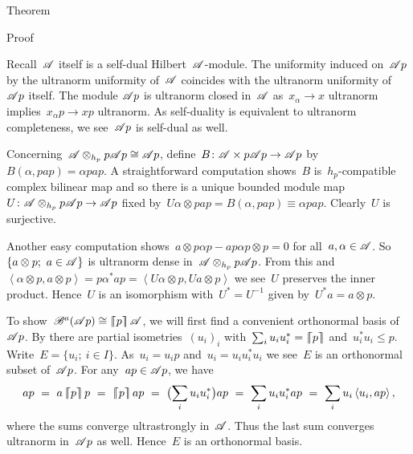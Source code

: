 \documentclass[b]{subfiles}
\begin{document}
\begin{parsec}
\begin{point}{Theorem}
\begin{point}{Proof}
\begin{point}
Recall~$\mathscr{A}$ itself is a self-dual Hilbert~$\mathscr{A}$-module.
The uniformity induced on~$\mathscr{A} p$ by the ultranorm uniformity
    of~$\mathscr{A}$ coincides with the ultranorm uniformity of~$\mathscr{A} p$ itself.
The module $\mathscr{A} p$ is ultranorm closed in~$\mathscr{A}$
    as~$x_\alpha \to x$ ultranorm
    implies~$x_\alpha p \to xp$ ultranorm.
As self-duality is equivalent to ultranorm completeness,
    we see~$\mathscr{A} p$ is self-dual as well.
\end{point}
\begin{point}%
Concerning~$\mathscr{A} \otimes_{h_p} p \mathscr{A} p \cong \mathscr{A} p$,
    define~$B\colon \mathscr{A} \times  p \mathscr{A} p \to \mathscr{A} p$
    by~$B(\alpha, pap) = \alpha pap$.
A straightforward computation
    shows~$B$ is~$h_p$-compatible complex bilinear map
    and so there is a unique bounded module
    map~$U \colon \mathscr{A} \otimes_{h_p} p \mathscr{A} p \to \mathscr{A} p$
   fixed by~$U \alpha \otimes pap = B(\alpha,pap) \equiv \alpha pap $.
   Clearly~$U$ is surjective.

Another easy computation shows~$a \otimes p\alpha p - ap\alpha p \otimes p = 0$
    for all~$a, \alpha \in \mathscr{A}$.
So~$\{a \otimes p;\ a\in \mathscr{A}\}$
    is ultranorm dense in~$\mathscr{A} \otimes_{h_p} p \mathscr{A} p$.
From this and
    $\left<\alpha \otimes p, a\otimes p\right> = 
        p \alpha^* a p
        =\left< U \alpha \otimes p, U a \otimes p\right> $
        we see~$U$ preserves the inner product.
Hence~$U$ is an isomorphism with~$U^* = U^{-1}$
    given by~$U^* a = a\otimes p$.
\end{point}
\begin{point}%
To show~$\mathscr{B}^a(\mathscr{A} p) \cong \left\lceil\!\!\left\lceil p\right\rceil\!\!\right\rceil\mathscr{A}$,
we will first find a convenient orthonormal basis of~$\mathscr{A} p$.
By 
    there are partial isometries~$(u_i)_i$
    with~$\sum_i u_iu_i^* = \left\lceil\!\!\left\lceil p\right\rceil\!\!\right\rceil$
    and~$u_i^*u_i \leq p$.
Write~$E = \{u_i; \ i \in I\}$.
As~$u_i = u_i p$ and~$u_i= u_i u_i^* u_i$
    we see~$E$ is an orthonormal subset of~$\mathscr{A} p$.
For any~$ap \in \mathscr{A} p$, we have
\begin{equation*}
    ap \ =\  a \cceil{p} p
       \ =\  \cceil{p} a p
       \ = \ \bigl(\sum_i u_i u_i^*\bigr) ap
       \ = \ \sum_i u_i u_i^* ap
       \ = \ \sum_i u_i \left<u_i,ap\right>,
\end{equation*}
where the sums converge ultrastrongly in~$\mathscr{A}$.
Thus the last sum converges ultranorm in~$\mathscr{A} p$ as well.
Hence~$E$ is an orthonormal basis.


\end{point}
\end{point}
\end{point}
\end{parsec}
\end{document}
